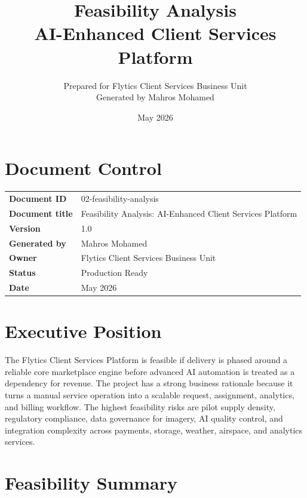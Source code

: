 \documentclass[11pt,a4paper]{article}
\title{\textbf{Feasibility Analysis\\AI-Enhanced Client Services Platform}}
\author{Prepared for Flytics Client Services Business Unit\\Generated by Mahros Mohamed}
\date{May 2026}
\begin{document}
\maketitle
\section*{Document Control}
\begin{longtable}{>{\bfseries}p{}p{}}
\toprule
Document ID & 02-feasibility-analysis \\
Document title & Feasibility Analysis: AI-Enhanced Client Services Platform \\
Version & 1.0 \\
Generated by & Mahros Mohamed \\
Owner & Flytics Client Services Business Unit \\
Status & Production Ready \\
Date & May 2026 \\
\bottomrule
\end{longtable}

\renewcommand{\contentsname}{Contents}
\tableofcontents
\newpage

\section*{Executive Position}

The Flytics Client Services Platform is feasible if delivery is phased around a reliable core marketplace engine before advanced AI automation is treated as a dependency for revenue. The project has a strong business rationale because it turns a manual service operation into a scalable request, assignment, analytics, and billing workflow. The highest feasibility risks are pilot supply density, regulatory compliance, data governance for imagery, AI quality control, and integration complexity across payments, storage, weather, airspace, and analytics services.

\section{Feasibility Summary}
\end{document}
